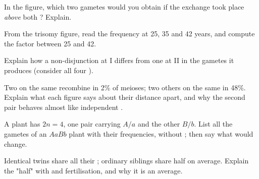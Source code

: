 \begin{exercise}[$\star\star$]\label{exo:g12:meiosis-genetic-shuffling:9}
In the  figure, which two gametes would you obtain if the
exchange took place \emph{above} both ? Explain.
\end{exercise}

\begin{exercise}[$\star\star$]\label{exo:g12:meiosis-genetic-shuffling:10}
From the trisomy figure, read the frequency at 25, 35 and 42 years,
and compute the factor between 25 and 42.
\end{exercise}

\begin{exercise}[$\star\star$]\label{exo:g12:meiosis-genetic-shuffling:11}
Explain how a non-disjunction at  I differs from one at 
II in the gametes it produces (consider all four ).
\end{exercise}

\begin{exercise}[$\star\star\star$]\label{exo:g12:meiosis-genetic-shuffling:12}
Two  on the same  recombine in 2\% of meioses; two
others on the same  in 48\%. Explain what each figure says
about their distance apart, and why the second pair behaves almost
like independent .
\end{exercise}

\begin{exercise}[$\star\star\star$]\label{exo:g12:meiosis-genetic-shuffling:13}
A plant has $2n = 4$, one pair carrying $A/a$ and the other $B/b$.
List all the gametes of an $AaBb$ plant with their frequencies,
without ; then say what  would change.
\end{exercise}

\begin{exercise}[$\star\star\star$]\label{exo:g12:meiosis-genetic-shuffling:14}
Identical twins share all their ; ordinary siblings share half
on average. Explain the "half" with  and fertilisation, and why
it is an average.
\end{exercise}

